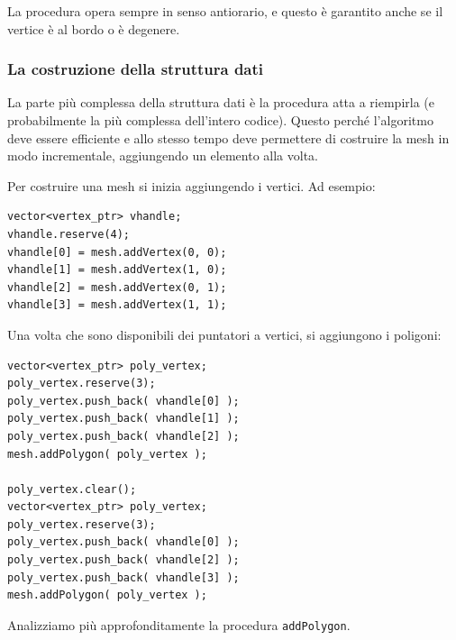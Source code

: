 La procedura opera sempre in senso antiorario, e questo è garantito anche se il vertice è al bordo o è degenere.
\subsubsection{La costruzione della struttura dati}
La parte più complessa della struttura dati è la procedura atta a riempirla (e probabilmente la più complessa dell'intero codice). Questo perché l'algoritmo deve essere efficiente e allo stesso tempo deve permettere di costruire la mesh in modo incrementale, aggiungendo un elemento alla volta.

Per costruire una mesh si inizia aggiungendo i vertici. Ad esempio:
\begin{lstlisting}[name=esempioMesh]
vector<vertex_ptr> vhandle;
vhandle.reserve(4);
vhandle[0] = mesh.addVertex(0, 0);
vhandle[1] = mesh.addVertex(1, 0);
vhandle[2] = mesh.addVertex(0, 1);
vhandle[3] = mesh.addVertex(1, 1);
\end{lstlisting}
Una volta che sono disponibili dei puntatori a vertici, si aggiungono i poligoni:
\begin{lstlisting}[name=esempioMesh]
vector<vertex_ptr> poly_vertex;
poly_vertex.reserve(3);
poly_vertex.push_back( vhandle[0] );
poly_vertex.push_back( vhandle[1] );
poly_vertex.push_back( vhandle[2] );
mesh.addPolygon( poly_vertex );

poly_vertex.clear();
vector<vertex_ptr> poly_vertex;
poly_vertex.reserve(3);
poly_vertex.push_back( vhandle[0] );
poly_vertex.push_back( vhandle[2] );
poly_vertex.push_back( vhandle[3] );
mesh.addPolygon( poly_vertex );
\end{lstlisting}
Analizziamo più approfonditamente la procedura \texttt{addPolygon}.

